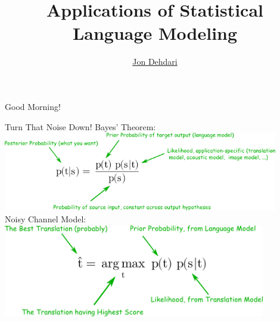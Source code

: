 \documentclass[xcolor=pdftex,x11names,table,hyperref]{beamer}
\begin{document}
\title{Applications of Statistical Language Modeling \\[1.5em]
 }
\author{\href{http://jon.dehdari.org}{Jon Dehdari}}
\frame{\titlepage}

\begin{frame}{Good Morning!}
	\begin{center}
	\end{center}
\end{frame}


\begin{frame}{Turn That Noise Down!}
	Bayes' Theorem: \\[0.5em]
	\includegraphics[width=0.90\textwidth]{images/bayes_theorem.png} \\[1.0em]
	\pause
	Noisy Channel Model: \\[0.5em]
	\includegraphics[width=0.86\textwidth]{images/noisy_channel.png}
\end{frame}
\end{document}
